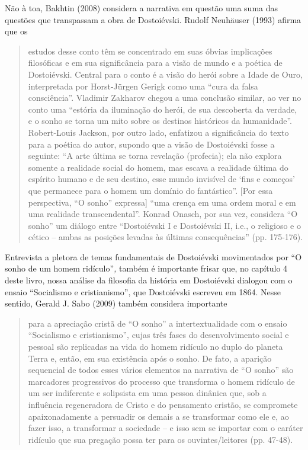 Não à toa, Bakhtin (2008) considera a narrativa em questão uma suma das
questões que transpassam a obra de Dostoiévski. Rudolf Neuhäuser (1993)
afirma que os

\begin{quote}
estudos desse conto têm se concentrado em suas óbvias implicações
filosóficas e em sua significância para a visão de mundo e a poética de
Dostoiévski. Central para o conto é a visão do herói sobre a Idade de
Ouro, interpretada por Horst-Jürgen Gerigk como uma ``cura da falsa
consciência''. Vladimir Zakharov chegou a uma conclusão similar, ao ver
no conto uma ``estória da iluminação do herói, de sua descoberta da
verdade, e o sonho se torna um mito sobre os destinos históricos da
humanidade''. Robert-Louis Jackson, por outro lado, enfatizou a
significância do texto para a poética do autor, supondo que a visão de
Dostoiévski fosse a seguinte: ``A arte última se torna revelação
(profecia); ela não explora somente a realidade social do homem, mas
escava a realidade última do espírito humano e de seu destino, esse
mundo invisível de `fins e começos' que permanece para o homem um
domínio do fantástico''. {[}Por essa perspectiva, ``O sonho''
expressa{]} ``uma crença em uma ordem moral e em uma realidade
transcendental''. Konrad Onasch, por sua vez, considera ``O sonho'' um
diálogo entre ``Dostoiévski I e Dostoiévski II, i.e., o religioso e o
cético -- ambas as posições levadas às últimas consequências'' (pp.
175-176).
\end{quote}

Entrevista a pletora de temas fundamentais de Dostoiévski movimentados
por ``O sonho de um homem ridículo''\emph{,} também é importante frisar
que, no capítulo 4 deste livro, nossa análise da filosofia da história
em Dostoiévski dialogou com o ensaio ``Socialismo e cristianismo'', que
Dostoiévski escreveu em 1864. Nesse sentido, Gerald J. Sabo (2009)
também considera importante

\begin{quote}
para a apreciação cristã de ``O sonho'' a intertextualidade com o ensaio
``Socialismo e cristianismo'', cujas três fases do desenvolvimento
social e pessoal são replicadas na vida do homem ridículo no duplo do
planeta Terra e, então, em sua existência após o sonho. De fato, a
aparição sequencial de todos esses vários elementos na narrativa de ``O
sonho'' são marcadores progressivos do processo que transforma o homem
ridículo de um ser indiferente e solipsista em uma pessoa dinânica que,
sob a influência regeneradora de Cristo e do pensamento cristão, se
compromete apaixonadamente a persuadir os demais a se transformar como
ele e, ao fazer isso, a transformar a sociedade -- e isso sem se
importar com o caráter ridículo que sua pregação possa ter para os
ouvintes/leitores (pp. 47-48).
\end{quote}

